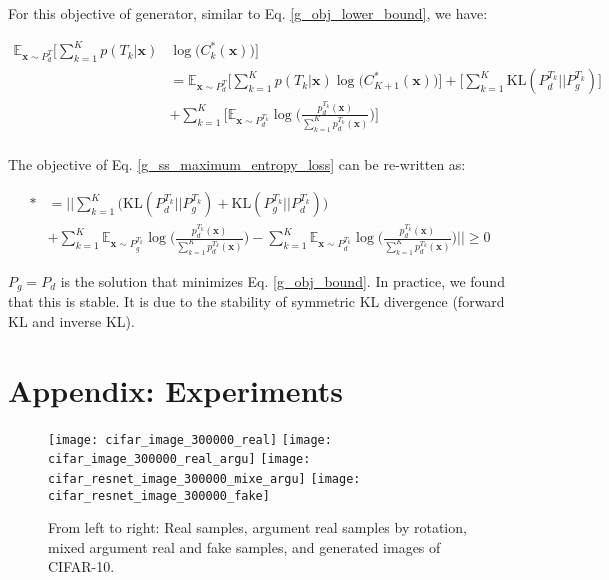 \documentclass{article}
\begin{document}
%
 
For this objective of generator, similar to Eq. \ref{g_obj_lower_bound}, we have: 

\begin{equation}
\begin{split}
\mathbb{E}_{\mathbf{x}\sim {P_d^T}}\bigg[\sum_{k=1}^{K}p({T_k}|\mathbf{x})&\log\Big(C^*_k(\mathbf{x})\Big)\bigg]\\
&= \mathbb{E}_{\mathbf{x} \sim P_d^T}\bigg[\sum_{k=1}^{K}p({T_k}|\mathbf{x})\log\Big(C^*_{K+1}(\mathbf{x})\Big)\bigg]+ \bigg[\sum_{k=1}^{K}\mathrm{KL}(P_d^{T_k}||P_g^{T_k})\bigg]\\
&+ \sum_{k=1}^{K}\bigg[\mathbb{E}_{\mathbf{x} \sim P_d^{T_k}}\log\Big(\frac{p_d^{T_k}(\mathbf{x})}{\sum_{k=1}^{K}p_d^{T_k}(\mathbf{x})}\Big)\bigg]\\
\end{split} 
\label{d_obj_lower_bound}
\end{equation}

The objective of Eq. \ref{g_ss_maximum_entropy_loss} can be re-written as:

\begin{equation}
\begin{split}
* 
&= \bigg|\bigg|\sum_{k=1}^{K}\Big(\mathrm{KL}(P_d^{T_k}||P_g^{T_k}) + \mathrm{KL}(P_g^{T_k}||P_d^{T_k})\Big) \\
&+ \sum_{k=1}^{K}\mathbb{E}_{\mathbf{x} \sim P_g^{T_k}}\log\Big(\frac{p_d^{T_k}(\mathbf{x})}{\sum_{k=1}^{K}p_d^{T_k}(\mathbf{x})}\Big)- \sum_{k=1}^{K}\mathbb{E}_{\mathbf{x} \sim P_d^{T_k}}\log\Big(\frac{p_d^{T_k}(\mathbf{x})}{\sum_{k=1}^{K}p_d^{T_k}(\mathbf{x})}\Big)\bigg|\bigg| \geq 0
\end{split}
\label{g_obj_bound}
\end{equation}

$P_g = P_d$ is the solution that minimizes Eq. \ref{g_obj_bound}. 
In practice, we found that this is stable. It is due to the stability of symmetric KL divergence (forward KL and inverse KL).




\section{Appendix: Experiments}
\label{appendix_b}



\begin{figure}
  \centering
\texttt{[image: cifar\_image\_300000\_real]}
  \texttt{[image: cifar\_image\_300000\_real\_argu]}
  \texttt{[image: cifar\_resnet\_image\_300000\_mixe\_argu]}
  \texttt{[image: cifar\_resnet\_image\_300000\_fake]}
  \caption{From left to right: Real samples, argument real samples by rotation, mixed argument real and fake samples, and generated images of CIFAR-10.}
  \label{cifar_resnet_samples}
\end{figure}
\end{document}
